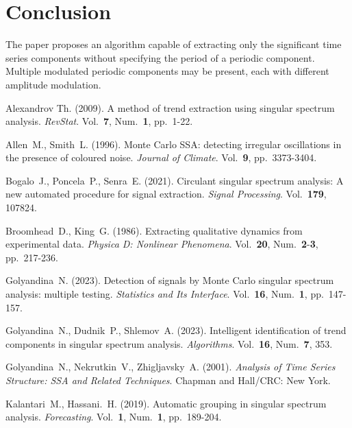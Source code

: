 \documentclass[12pt]{article}
\begin{document}
\section{Conclusion}
The paper proposes an algorithm capable of extracting only the significant time series components without specifying the period of a periodic component. Multiple modulated periodic components may be present, each with different amplitude modulation.


\begin{thebibliography}{10}

     Alexandrov Th. (2009). A method of trend extraction using singular spectrum analysis. {\sl RevStat}. Vol.~{\bf 7}, Num.~{\bf 1}, pp.~1-22.

     Allen~M., Smith~L. (1996). Monte Carlo SSA: detecting irregular oscillations in the presence of coloured noise. {\sl Journal of Climate}. Vol.~{\bf 9}, pp.~3373-3404.

     Bogalo~J., Poncela~P., Senra~E. (2021). Circulant singular spectrum analysis: A new automated procedure for signal extraction. {\sl Signal Processing}. Vol.~{\bf 179}, 107824.

     Broomhead~D., King~G. (1986). Extracting qualitative dynamics from experimental data. {\sl Physica D: Nonlinear Phenomena}. Vol.~{\bf 20}, Num.~{\bf 2}-{\bf 3}, pp.~217-236.

     Golyandina~N. (2023). Detection of signals by Monte Carlo singular spectrum analysis: multiple testing. {\sl Statistics and Its Interface}. Vol.~{\bf 16}, Num.~{\bf 1}, pp.~147-157.

     Golyandina~N., Dudnik~P., Shlemov~A. (2023). Intelligent identification of trend components in singular spectrum analysis. {\sl Algorithms}. Vol.~{\bf 16}, Num.~{\bf 7}, 353.

     Golyandina~N., Nekrutkin~V., Zhigljavsky~A. (2001). {\sl Analysis of Time Series Structure: SSA and Related Techniques}. Chapman and Hall/CRC: New York.

     Kalantari~M., Hassani.~H. (2019). Automatic grouping in singular spectrum analysis. {\sl Forecasting}. Vol.~{\bf 1}, Num.~{\bf 1}, pp.~189-204.

\end{thebibliography}
\end{document}
